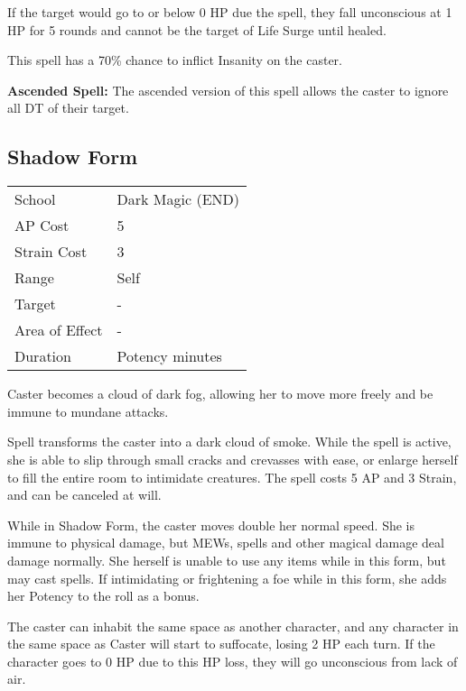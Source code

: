 \documentclass[11pt,a4paper,twocolumn]{book}
\begin{document}
If the target would go to or below 0 HP due the spell, they fall unconscious at 1 HP for 5 rounds and cannot be the target of Life Surge until healed.

This spell has a 70\% chance to inflict Insanity on the caster.

\bigskip

\textbf{Ascended Spell:} The ascended version of this spell allows the caster to ignore all DT of their target.


\subsection*{Shadow Form}

{
	\begin{tabu} to 75mm{| X[l,4] | X[l,7] |}
		\hline
		School 			& Dark Magic (END) 		\\
		AP Cost	      	& 5 					\\
		Strain Cost     & 3 					\\
		Range     		& Self					\\
		Target      	& -						\\
		Area of Effect  & -  	 				\\
		Duration     	& Potency minutes		\\ \hline
	\end{tabu}
	
}

\medskip

Caster becomes a cloud of dark fog, allowing her to move more freely and be immune to mundane attacks. 	

Spell transforms the caster into a dark cloud of smoke. While the spell is active, she is able to slip through small cracks and crevasses with ease, or enlarge herself to fill the entire room to intimidate creatures. The spell costs 5 AP and 3 Strain, and can be canceled at will.

While in Shadow Form, the caster moves double her normal speed. She is immune to physical damage, but MEWs, spells and other magical damage deal damage normally. She herself is unable to use any items while in this form, but may cast spells. If intimidating or frightening a foe while in this form, she adds her Potency to the roll as a bonus.

The caster can inhabit the same space as another character, and any character in the same space as Caster will start to suffocate, losing 2 HP each turn. If the character goes to 0 HP due to this HP loss, they will go unconscious from lack of air.
\end{document}
